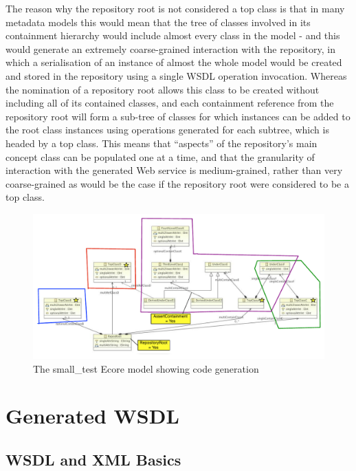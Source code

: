 \documentclass[11pt]{article}
\begin{document}
The reason why the repository root is not considered a top class is that in many metadata models this would mean that the tree of classes involved in its containment hierarchy would include almost every class in the model - and this would generate an extremely coarse-grained interaction with the repository, in which a serialisation of an instance of almost the whole model would be created and stored in the repository using a single WSDL operation invocation. Whereas the nomination of a repository root allows this class to be created without including all of its contained classes, and each containment reference from the repository root will form a sub-tree of classes for which instances can be added to the root class instances using operations generated for each subtree, which is headed by a top class. This means that ``aspects'' of the repository's main concept class can be populated one at a time, and that the granularity of interaction with the generated Web service is medium-grained, rather than very coarse-grained as would be the case if the repository root were considered to be a top class.

\begin{figure}[htbp]
\begin{center}
\includegraphics[width=15cm]{SmallTestEcoreWithCodeGen.pdf}
\caption{The small\_test Ecore model showing code generation}
\label{small-test-code}
\end{center}
\end{figure}

\section{Generated WSDL}

\subsection{WSDL and XML Basics}
\end{document}
